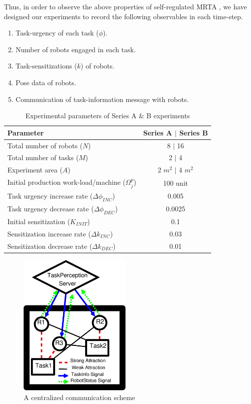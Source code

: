 \documentclass[preprint,12pt]{elsarticle}
\begin{document}
Thus, in order to observe the above properties of self-regulated MRTA , we have designed our experiments to record the following  observables in each time-step.
\begin{enumerate}
\item Task-urgency of each task ($\phi$).
\item Number of robots engaged in each task.
\item Task-sensitizations ($k$) of robots.
\item Pose data of robots.
\item Communication of task-information message with robots.  
\end{enumerate}
\begin{table}
\caption{Experimental parameters of Series A \& B experiments}
\label{table:params}
\begin{center}
\begin{tabular}{|l|c|}
\hline Parameter & Series A $\mid$ Series B\\
\hline Total number of robots ($N$) & \hspace*{0.1cm} 8 $\mid$ 16\\
\hline Total number of tasks ($M$) & 2 $\mid$ 4\\
\hline Experiment area ($A$) & 2 $m^2$ $\mid$  4 $m^2$\\
\hline Initial production work-load/machine ($\Omega_{j}^{p}$) & 100 unit \\
\hline Task urgency increase rate ($\Delta\phi_{INC}$) & 0.005\\
\hline Task urgency decrease rate ($\Delta\phi_{DEC}$) & 0.0025\\
\hline Initial sensitization ($K_{INIT}$) & 0.1\\
\hline Sensitization increase rate ($\Delta k_{INC}$) & 0.03\\
\hline Sensitization decrease rate ($\Delta k_{DEC}$) & 0.01\\
\hline
\end{tabular}
\end{center}
\end{table}
\begin{figure}
\centering
\includegraphics[height=7cm, angle=0]{./images/CentralizedComm.eps}
\caption{\small A centralized communication scheme} %
\label{fig:ccm} %
\end{figure}
\end{document}
